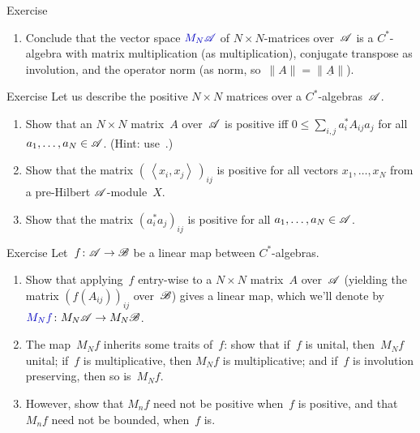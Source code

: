 \documentclass[a]{subfiles}
\begin{document}
\begin{parsec}
\begin{point}{Exercise}
\begin{enumerate}
\item
Conclude that the vector space $\Define{M_N\scrA}$
of $N\times N$-matrices over~$\mathscr{A}$
is a $C^*$-algebra
with matrix multiplication (as multiplication),
conjugate transpose as involution,
and the operator norm (as norm, so~$\|A\|=\|\underline{A}\|$).
\end{enumerate}
\end{point}
\begin{point}{Exercise}%
Let us describe the positive  $N\times N$ matrices
over a $C^*$-algebras~$\mathscr{A}$.
\begin{enumerate}
\item
Show that an $N\times N$ matrix~$A$ over~$\mathscr{A}$
is positive iff $0\leq \sum_{i,j} a_i^* A_{ij} a_j$
for all~$a_1,\dotsc,a_N\in\mathscr{A}$.
(Hint: use~.)
\item
Show that the matrix $(\,\left<x_i,x_j\right>\,)_{ij}$
is positive for all vectors $x_1,\dotsc,x_N$
from a pre-Hilbert $\mathscr{A}$-module~$X$.
\item
Show that the matrix $(a^*_ia_j)_{ij}$
is positive for all $a_1,\dotsc,a_N\in\mathscr{A}$.
\end{enumerate}
\end{point}
\begin{point}{Exercise}%
Let~$f\colon \mathscr{A}\to\mathscr{B}$ be a linear map between $C^*$-algebras.
\begin{enumerate}
\item
Show that applying~$f$ entry-wise to a $N\times N$ matrix~$A$
over~$\mathscr{A}$ (yielding the matrix $(f(A_{ij}))_{ij}$ over~$\mathscr{B}$)
gives a linear map,
which we'll denote by~$\Define{M_Nf}\colon M_N\scrA\to M_N\scrB$.
\item
The map~$M_Nf$ inherits some traits of~$f$:
show that if~$f$ is unital, then~$M_Nf$ unital;
if~$f$ is multiplicative, then $M_Nf$ is multiplicative; and
if~$f$ is involution preserving, then so is~$M_Nf$.
\item
However,
show that $M_nf$ need not be positive when~$f$ is positive,
and that~$M_nf$ need not be bounded, when~$f$ is.
\end{enumerate}
\end{point}
\end{parsec}
\end{document}
